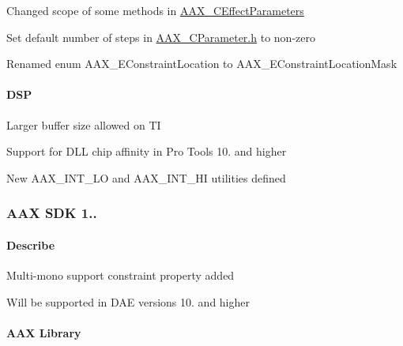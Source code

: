 \begin{DoxyItemize}
\item Changed scope of some methods in \mbox{\hyperlink{a01481}{A\+A\+X\+\_\+\+C\+Effect\+Parameters}} 
\item Set default number of steps in \mbox{\hyperlink{a00455}{A\+A\+X\+\_\+\+C\+Parameter.\+h}} to non-\/zero 
\item Renamed enum A\+A\+X\+\_\+\+E\+Constraint\+Location to A\+A\+X\+\_\+\+E\+Constraint\+Location\+Mask 
\end{DoxyItemize}\hypertarget{a00847_aax_sdk_1p0p5_DSP}{}\paragraph{D\+SP}\label{a00847_aax_sdk_1p0p5_DSP}

\begin{DoxyItemize}
\item Larger buffer size allowed on TI 
\item Support for D\+LL chip affinity in Pro Tools 10. and higher 
\item New A\+A\+X\+\_\+\+I\+N\+T\+\_\+\+LO and A\+A\+X\+\_\+\+I\+N\+T\+\_\+\+HI utilities defined 
\end{DoxyItemize}\hypertarget{a00847_aax_sdk_1p0p4}{}\subsubsection{A\+A\+X S\+D\+K 1..}\label{a00847_aax_sdk_1p0p4}
\hypertarget{a00847_aax_sdk_1p0p4_Describe}{}\paragraph{Describe}\label{a00847_aax_sdk_1p0p4_Describe}

\begin{DoxyItemize}
\item Multi-\/mono support constraint property added 
\begin{DoxyItemize}
\item Will be supported in D\+AE versions 10. and higher 
\end{DoxyItemize}
\end{DoxyItemize}\hypertarget{a00847_aax_sdk_1p0p4_AAXLibrary}{}\paragraph{A\+A\+X Library}\label{a00847_aax_sdk_1p0p4_AAXLibrary}

